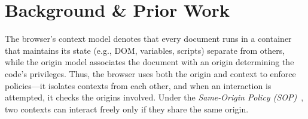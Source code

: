 \section{Background \& Prior Work}


\label{sec:threat-model}

The browser's context model denotes that every document runs in a container 
that maintains its state (e.g., DOM, variables, scripts) separate from others, while the origin model associates the document with an origin determining the code’s privileges.
%
Thus, the browser uses both the origin and context to enforce policies---it isolates contexts from each other, and when an interaction is attempted, it checks the origins involved.
%
Under the \textit{Same-Origin Policy (SOP)}~\cite{mdnSameoriginPolicySecurity2024}, two contexts can interact freely only if they share the same origin.

